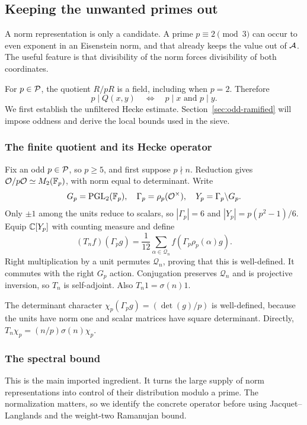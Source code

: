 \subsection{Keeping the unwanted primes out}\label{sec:spectral}
A norm representation is only a candidate. A prime $p\equiv2\pmod3$
can occur to even exponent in an Eisenstein norm, and that already keeps
the value out of $\AA$. The useful feature is that divisibility of the
norm forces divisibility of both coordinates.

For $p\in\PP$, the quotient $R/pR$ is a field, including when $p=2$.
Therefore
\begin{equation}\label{eq:anisotropic}
p\mid Q(x,y)\quad\Longleftrightarrow\quad p\mid x\text{ and }p\mid y.
\end{equation}
We first establish the unfiltered Hecke estimate. Section~\ref{sec:odd-ramified}
will impose oddness and derive the local bounds used in the sieve.

\subsubsection{The finite quotient and its Hecke operator}
Fix an odd $p\in\PP$, so $p\ge5$, and first suppose $p\nmid n$.
Reduction gives $\OO/p\OO\simeq M_2(\F_p)$, with norm equal to determinant.
Write
\[
G_p=\PGL_2(\F_p),\quad \Gamma_p=\rho_p(\OO^\times),\quad
Y_p=\Gamma_p\backslash G_p.
\]
Only $\pm1$ among the units reduce to scalars, so
$|\Gamma_p|=6$ and $|Y_p|=p(p^2-1)/6$. Equip $\C[Y_p]$ with counting
measure and define
\begin{equation}\label{eq:hecke}
(T_nf)(\Gamma_p g)=\frac1{12}\sum_{\alpha\in\mathcal Q_n}
f(\Gamma_p\rho_p(\alpha)g).
\end{equation}
Right multiplication by a unit permutes $\mathcal Q_n$, proving that this
is well-defined. It commutes with the right $G_p$ action. Conjugation
preserves $\mathcal Q_n$ and is projective inversion, so $T_n$ is
self-adjoint. Also $T_n1=\sigma(n)1$.

The determinant character
$\chi_p(\Gamma_p g)=(\det(g)/p)$ is well-defined, because the units have
norm one and scalar matrices have square determinant. Directly,
$T_n\chi_p=(n/p)\sigma(n)\chi_p$.

\subsubsection{The spectral bound}
This is the main imported ingredient. It turns the large supply of norm
representations into control of their distribution modulo a prime. The
normalization matters, so we identify the concrete operator before using
Jacquet--Langlands and the weight-two Ramanujan bound.

